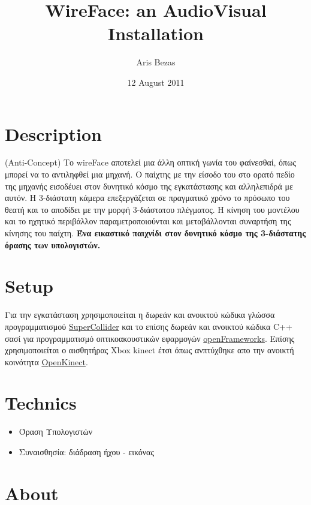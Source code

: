 \documentclass[11pt]{article}
\begin{document}
\title{WireFace: an AudioVisual Installation}
\author{Aris Bezas}
\date{12 August 2011}
\maketitle

\setcounter{tocdepth}{3}
\tableofcontents
\vspace*{1cm}




\section{Description}
\label{sec-1}

(Anti-Concept) 
Το wireFace αποτελεί μια άλλη οπτική γωνία του φαίνεσθαί, όπως μπορεί να το αντιληφθεί μια μηχανή. Ο παίχτης με την είσοδο του στο ορατό πεδίο της μηχανής εισοδέυει στον δυνητικό κόσμο της εγκατάστασης και αλληλεπιδρά με αυτόν. Η 3-διάστατη κάμερα επεξεργάζεται σε πραγματικό χρόνο το πρόσωπο του θεατή και το αποδίδει με την μορφή 3-διάστατου πλέγματος. Η κίνηση του μοντέλου και το ηχητικό περιβάλλον παραμετροποιούνται και μεταβάλλονται συναρτήση της κίνησης του παίχτη. 
\textbf{Ένα εικαστικό παιχνίδι στον δυνητικό κόσμο της 3-διάστατης όρασης των υπολογιστών.}
\section{Setup}
\label{sec-2}

Για την εγκατάσταση χρησιμοποιείται η δωρεάν και ανοικτού κώδικα γλώσσα προγραμματισμού \href{http://supercollider.sourceforge.net/}{SuperCollider} και το επίσης δωρεάν και ανοικτού κώδικα C++ σασί για προγραμματισμό οπτικοακουστικών εφαρμογών \href{http://www.openframeworks.cc/}{openFrameworks}. Επίσης χρησιμοποιείται ο αισθητήρας Xbox kinect έτσι όπως ανπτύχθηκε απο την ανοικτή κοινότητα \href{http://openkinect.org/wiki/Main_Page}{OpenKinect}.
\section{Technics}
\label{sec-3}

\begin{itemize}
\item Όραση Υπολογιστών
\item Συναισθησία: διάδραση ήχου - εικόνας
\end{itemize}
\section{About}
\label{sec-4}
\end{document}
